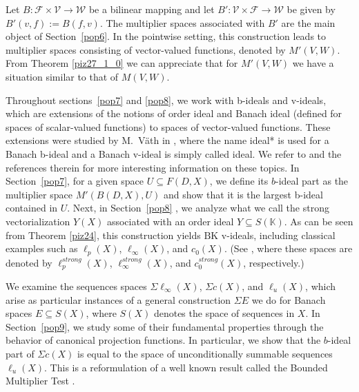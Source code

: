 \documentclass[14pt, a4paper]{article}  %
\newcommand{\K}{\mathbb{K}}
\newcommand{\BK}{\text{BK}}
\begin{document}
 
 
   Let $B \colon \mathcal F \times \mathcal V \to \mathcal W$ be a   bilinear mapping and let
   $B' \colon \mathcal V \times \mathcal F \to \mathcal W$ be given by $B'(v,f) := B(f,v)$.
   The multiplier spaces associated with $B'$ are the main object of Section~\ref{pop6}.
   In the pointwise setting, this construction leads to multiplier spaces consisting of vector-valued functions,  denoted by $M'(V,W)$. From Theorem \ref{piz27_1_0} we can appreciate that for $M'(V,W)$  we have a situation similar to that of $M(V,W)$.
   
   
  Throughout sections~\ref{pop7} and \ref{pop8}, we work with b-ideals and v-ideals, which  are extensions of the notions of order ideal and Banach ideal (defined for spaces of scalar-valued functions) to spaces of vector-valued functions. These extensions were  studied by M.~Väth  in \cite{V}, where the name ideal* is used for a Banach b-ideal and   a Banach v-ideal is simply called ideal. We refer to \cite{V}  and the references therein for more interesting information  on these topics.  In Section~\ref{pop7}, for a given space $U \subseteq F(D,X)$, we define its $b$-ideal part as the multiplier space $M'(B(D,X),U)$ and show that it is the largest b-ideal contained in $U$. 
   Next, in Section~\ref{pop8} , we analyze what we call the strong vectorialization $Y(X)$ associated with an order ideal $Y \subseteq S(\K)$. As can be seen from Theorem \ref{piz24}, this construction yields $\BK$ v-ideals, including classical examples such as $\ell_p(X)$, $\ell_\infty(X)$, and $c_0(X)$. (See \cite[p.~32]{DJT}, where these spaces are denoted by $\ell_{p}^{strong}(X)$, $\ell_{\infty}^{strong}(X)$, and $c_0^{strong}(X)$, respectively.)
   
   We examine the sequences spaces $\Sigma \ell_{\infty}(X)$, $\Sigma c(X)$, and $\ell_{u}(X)$,
   which arise as particular instances of a general construction $\Sigma E$ we do for 
   Banach spaces $E \subseteq S(X)$, where $S(X)$ denotes the space of sequences in $X$. In Section~\ref{pop9}, we study some of their fundamental
   properties through the behavior of canonical projection functions. In particular,
   we show that the $b$-ideal part of $\Sigma c(X)$ is equal to the space of unconditionally summable sequences $\ell_{u}(X)$. This is a reformulation of   a  well known result called the Bounded Multiplier Test \cite[p. 5, 22]{DJT}.
   
    
   
   
   
\end{document}
